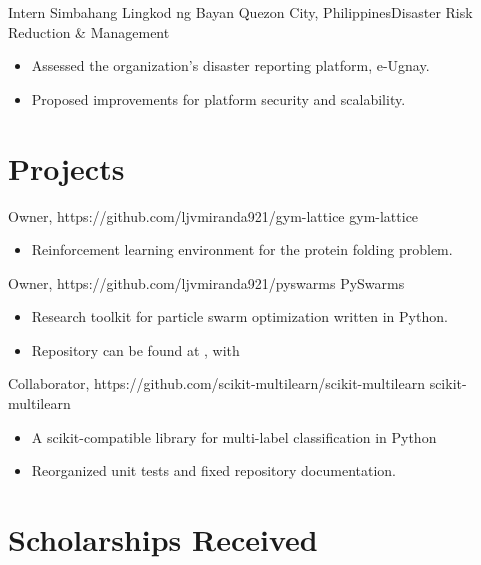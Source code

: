 \documentclass[11pt,a4paper,sans]{moderncv}
\begin{document}
        {Intern}
        {Simbahang Lingkod ng Bayan}
        {Quezon City, Philippines}{Disaster Risk Reduction \& Management}
        {
            \begin{itemize}
                \item Assessed the organization's disaster reporting platform, e-Ugnay.
                \item Proposed improvements for platform security and scalability.
            \end{itemize}
        }


\section{Projects}

        {Owner, https://github.com/ljvmiranda921/gym-lattice}
        {gym-lattice}{}{}
        {
            \begin{itemize}
                \item Reinforcement learning environment for the protein
                    folding problem. 
            \end{itemize}
        }

        {Owner, https://github.com/ljvmiranda921/pyswarms}
        {PySwarms}{}{}
        {
            \begin{itemize}
                \item Research toolkit for particle swarm optimization written in Python.
                \item Repository can be found at {\color{blue} }, with {\color{blue}}
            \end{itemize}
        }

        {Collaborator, https://github.com/scikit-multilearn/scikit-multilearn}
        {scikit-multilearn}{}{}
        {
            \begin{itemize}
                \item A scikit-compatible library for multi-label classification in Python
                \item Reorganized unit tests and fixed repository documentation.
            \end{itemize}
        }

\section{Scholarships Received}
\nocite{*}


\end{document}
